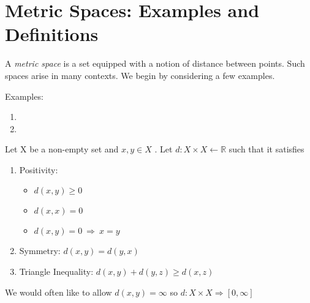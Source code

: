 \section{Metric Spaces: Examples and Definitions}

A \emph{metric space} is a set equipped with a notion of distance between points. Such
spaces arise in many contexts. We begin by considering a few examples.

\vspace{0.2in}
\noindent Examples:

\begin{enumerate}
\item
\item
\end{enumerate}

\begin{defn}
Let X be a non-empty set and $x, y \in X$ . Let $d: X\times X \leftarrow \mathbb{R}$ such that it satisfies
\begin{enumerate}
    \item Positivity:
    \begin{itemize}
        \item $d(x,y) \geq 0$
        \item $d(x,x) = 0$
        \item $d(x,y) = 0 \ \Rightarrow\ x = y$
    \end{itemize}
    \item Symmetry:  $d(x,y) = d(y, x)$
    \item Triangle Inequality: $d(x,y)+d(y,z) \geq d(x,z)$
\end{enumerate}
\vspace{1pt}
\begin{rmk}
    We would often like to allow $d(x,y)=\infty$ so $d:X\times X \Rightarrow [0, \infty]$
\end{rmk}
\end{defn}
